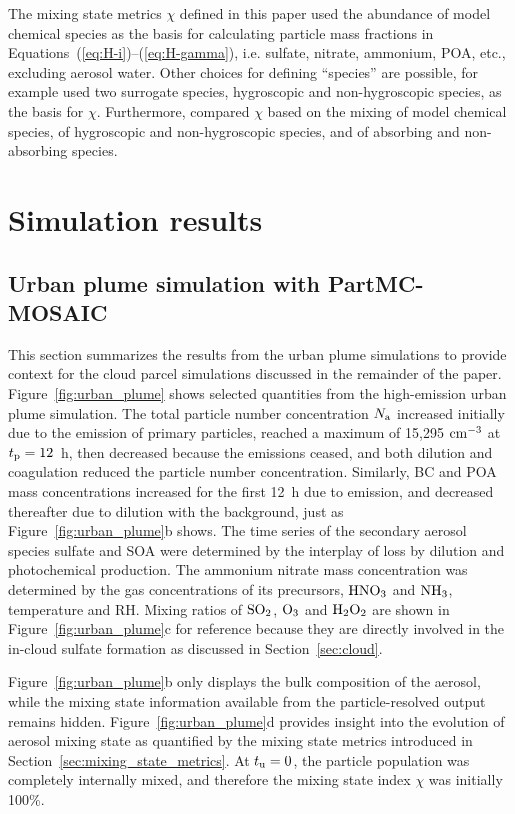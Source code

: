 \documentclass[edeposit,fullpage]{uiucthesis2009}
\begin{document}
The mixing state metrics $\chi$ defined in this paper used the
abundance of model chemical species as the basis for calculating
particle mass fractions in
Equations~(\ref{eq:H-i})--(\ref{eq:H-gamma}), i.e. sulfate, nitrate,
ammonium, POA, etc., excluding aerosol water. Other choices for
defining ``species'' are possible, for example \citet{Ching2017} used
two surrogate species, hygroscopic and non-hygroscopic species, as the
basis for $\chi$. Furthermore, \citet{Zheng2021} compared $\chi$ based
on the mixing of model chemical species, of hygroscopic and
non-hygroscopic species, and of absorbing and non-absorbing species.

\section{Simulation results}
\label{sec:results}
\subsection{Urban plume simulation with PartMC-MOSAIC}
\label{sec:urban_plume}

This section summarizes the results from the urban plume simulations
to provide context for the cloud parcel simulations discussed in the
remainder of the paper. Figure~\ref{fig:urban_plume} shows selected
quantities from the high-emission urban plume simulation. The
total particle number concentration $N_{\rm a}$ increased initially
due to the emission of primary particles, reached a maximum of 15,295
$\rm cm^{-3}$ at $t_{\rm p} = 12$~h, then decreased because the
emissions ceased, and both dilution and coagulation reduced the
particle number concentration. Similarly, BC and POA mass
concentrations increased for the first 12~h due to emission, and
decreased thereafter due to dilution with the background, just as
Figure~\ref{fig:urban_plume}b shows. The time series of the secondary
aerosol species sulfate and SOA were determined by the interplay of
loss by dilution and photochemical production. The ammonium nitrate
mass concentration was determined by the gas concentrations of its
precursors, $\rm HNO_3$ and $\rm NH_3$, temperature and RH. Mixing
ratios of $\rm SO_2$, $\rm O_3$ and $\rm H_2O_2$ are shown in
Figure~\ref{fig:urban_plume}c for reference because they are directly
involved in the in-cloud sulfate formation as discussed in
Section~\ref{sec:cloud}.

Figure~\ref{fig:urban_plume}b only displays the bulk composition of
the aerosol, while the mixing state information available from the
particle-resolved output remains hidden. Figure~\ref{fig:urban_plume}d
provides insight into the evolution of aerosol mixing state as
quantified by the mixing state metrics introduced in
Section~\ref{sec:mixing_state_metrics}. At $t_{\rm u} = 0$, the
particle population was completely internally mixed, and therefore the
mixing state index $\chi$ was initially 100\%.
\end{document}
